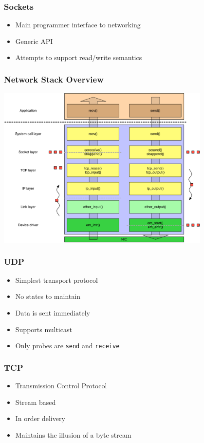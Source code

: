 \documentclass[pdftex]{beamer} %
\begin{document}
\begin{frame}
  \frametitle{Sockets}
  \begin{itemize}
  \item Main programmer interface to networking
  \item Generic API
  \item Attempts to support read/write semantics
  \end{itemize}
\end{frame}

\begin{frame}
  \frametitle{Network Stack Overview}
\centering
\includegraphics[width=0.8\textwidth]{../../figures/network-in-out.pdf}
\end{frame}

\begin{frame}[fragile]
  \frametitle{UDP}
  \begin{itemize}
  \item Simplest transport protocol
  \item No states to maintain
  \item Data is sent immediately
  \item Supports multicast
  \item Only probes are \verb+send+ and \verb+receive+
  \end{itemize}
\end{frame}

\begin{frame}
  \frametitle{TCP}
  \begin{itemize}
  \item Transmission Control Protocol
  \item Stream based
  \item In order delivery
  \item Maintains the illusion of a byte stream
  \end{itemize}
\end{frame}
\end{document}

